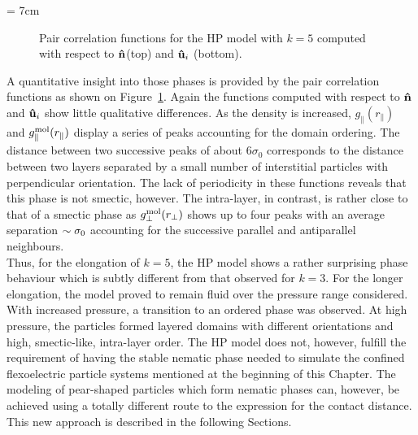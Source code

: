 \picW = 7cm
\begin{figure}
	\centering
	
	\caption{Pair correlation functions for the HP model with $k=5$ computed with respect to
	$\mathbf{\hat{n} }$(top) and $\mathbf{\hat{u} }_i$ (bottom).}
	\label{HP_k5_grs}
\end{figure}


A quantitative insight into those phases is provided by the pair correlation functions as shown on
Figure~\ref{HP_k5_grs}. Again the functions computed with respect to $\mathbf{\hat{n} }$ and $\mathbf{\hat{u} }_i$ show
little qualitative differences. As the density is increased, $g_\parallel(r_\parallel)$ and 
$g^{\mathrm{mol}}_\parallel(r_\parallel)$ display
a series of peaks accounting for the domain ordering. The distance between two successive peaks of about
$6\sigma_0$ corresponds to the distance between two layers separated by a small number of
interstitial particles with perpendicular orientation.
The lack of periodicity in these functions reveals 
that this phase is not smectic, however. The intra-layer, in contrast, is rather 
close to that of a smectic phase as $g^{\mathrm{mol}}_\perp(r_\perp)$ shows up to four peaks with an average 
separation $\sim\sigma_0$  accounting for the successive parallel and antiparallel neighbours.\\

Thus, for the elongation of $k=5$, the HP model shows a rather surprising phase behaviour which is
subtly different from that observed for $k=3$. For the longer elongation, the model proved to
remain fluid over the pressure range considered. With increased pressure, a transition to an
ordered phase was observed. At high pressure, the particles formed layered domains with different
orientations and high, smectic-like, intra-layer order.
The HP model does not, however, fulfill the requirement of having the stable nematic phase 
needed to simulate the
confined flexoelectric particle systems mentioned at the beginning of this
Chapter. The modeling of pear-shaped particles which form nematic phases can, however, be achieved 
using a totally different route to the expression for the contact distance.
This new approach is described in the following Sections.

